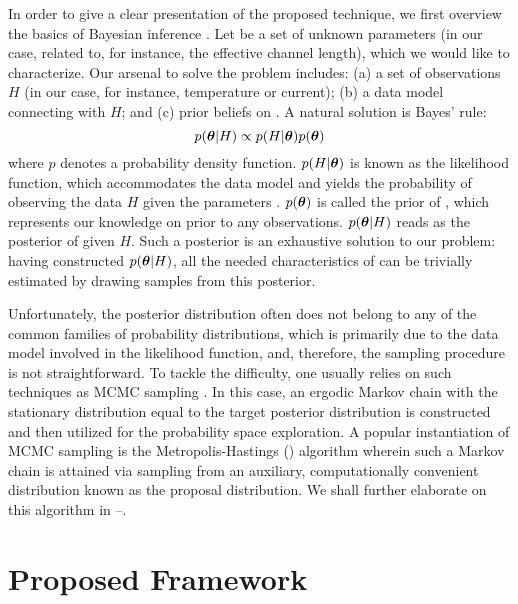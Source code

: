 In order to give a clear presentation of the proposed technique, we first
overview the basics of Bayesian inference \cite{gelman2004}. Let \vt be a set of
unknown parameters (in our case, related to, for instance, the effective channel
length), which we would like to characterize. Our arsenal to solve the problem
includes: (a) a set of observations $H$ (in our case, for instance, temperature
or current); (b) a data model connecting \vt with $H$; and (c) prior beliefs on
\vt. A natural solution is Bayes' rule:
\begin{equation} \elab{bayes-theorem}
  p(\vt | H) \propto p(H | \vt) p(\vt)
\end{equation}
where $p$ denotes a probability density function. $p(H | \boldsymbol{\theta})$ is known as the
likelihood function, which accommodates the data model and yields the
probability of observing the data $H$ given the parameters \vt. $p(\boldsymbol{\theta})$ is
called the prior of \vt, which represents our knowledge on \vt prior to any
observations. $p(\boldsymbol{\theta} | H)$ reads as the posterior of \vt given $H$. Such a
posterior is an exhaustive solution to our problem: having constructed $p(\boldsymbol{\theta} |
H)$, all the needed characteristics of \vt can be trivially estimated by drawing
samples from this posterior.

Unfortunately, the posterior distribution often does not belong to any of the
common families of probability distributions, which is primarily due to the data
model involved in the likelihood function, and, therefore, the sampling
procedure is not straightforward. To tackle the difficulty, one usually relies
on such techniques as \ac{MCMC} sampling \cite{gelman2004}. In this case, an
ergodic Markov chain with the stationary distribution equal to the target
posterior distribution is constructed and then utilized for the probability
space exploration. A popular instantiation of \ac{MCMC} sampling is the
Metropolis-Hastings () algorithm wherein such a Markov chain is attained
via sampling from an auxiliary, computationally convenient distribution known as
the proposal distribution. We shall further elaborate on this algorithm in
--.

\section{Proposed Framework}

